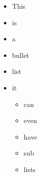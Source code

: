 \begin{itemize}
    \item This
    \item is
    \item a
    \item bullet
    \item list
    \item it
    \begin{itemize}
        \item can
        \item even
        \item have
        \item sub
        \item lists
    \end{itemize}
\end{itemize}